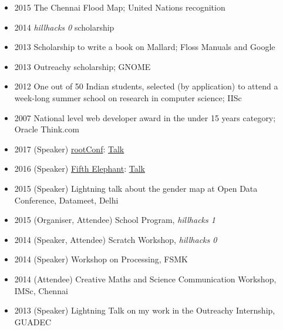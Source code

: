 \documentclass{scrartcl}
\newenvironment{myitemize}
{ \begin{itemize}
    \footnotesize\setlength{\itemsep}{0pt}
    \footnotesize\setlength{\parskip}{0pt}
    \footnotesize\setlength{\parsep}{0pt}     }
{ \end{itemize}                  }  %
\begin{document}
\begin{cv}{}
\centering{}
\begin{myitemize} 
  \item {2015} The Chennai Flood Map; United Nations recognition
  \item {2014} \textit{hillhacks 0} scholarship
  \item {2013} Scholarship to write a book on Mallard; Floss Manuals and Google 
  \item {2013} Outreachy scholarship; GNOME
  \item {2012} One out of 50 Indian students, selected (by application) to attend a week-long summer school on research in computer science; IISc
  \item {2007} National level web developer award in the under 15 years category; Oracle Think.com
\end{myitemize}

\centering{}
\begin{myitemize}
  \item {2017} {(Speaker)} \href{https://rootconf.talkfunnel.com/2017/72-spotswap-running-production-apis-on-spot-instances}{rootConf}: \href{https://www.youtube.com/watch?v=XQJ7YhVoSWI}{Talk}
  \item {2016} {(Speaker)} \href{https://fifthelephant.talkfunnel.com/2016/40-reducing-the-world-with-javascript}{Fifth Elephant}: \href{https://www.youtube.com/watch?v=KtUMS47TNNM}{Talk}
  \item {2015} {(Speaker)} Lightning talk about the gender map at Open Data Conference, Datameet, Delhi
  \item {2015} {(Organiser, Attendee)} School Program, \textit{hillhacks 1}
  \item {2014} {(Speaker, Attendee)} Scratch Workshop, \textit{hillhacks 0}
  \item {2014} {(Speaker)} Workshop on Processing, FSMK
  \item {2014} {(Attendee)} Creative Maths and Science Communication Workshop, IMSc, Chennai
  \item {2013} {(Speaker)} Lightning Talk on my work in the Outreachy Internship, GUADEC 
\end{myitemize}


\end{cv}
\end{document}
